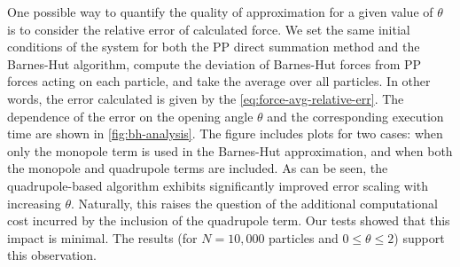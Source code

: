 One possible way to quantify the quality of approximation for a given value of $\theta$ is to consider the relative error of calculated force.
We set the same initial conditions of the system for both the PP direct summation method and the Barnes-Hut algorithm, compute the deviation of Barnes-Hut forces from PP forces acting on each particle, and take the average over all particles.
In other words, the error calculated is given by the \autoref{eq:force-avg-relative-err}.
The dependence of the error on the opening angle $\theta$ and the corresponding execution time are shown in \autoref{fig:bh-analysis}.
The figure includes plots for two cases: when only the monopole term is used in the Barnes-Hut approximation, and when both the monopole and quadrupole terms are included.
As can be seen, the quadrupole-based algorithm exhibits significantly improved error scaling with increasing $\theta$.
Naturally, this raises the question of the additional computational cost incurred by the inclusion of the quadrupole term.
Our tests showed that this impact is minimal.
The results (for $N = 10{,}000$ particles and $0 \leq \theta \leq 2$) support this observation.
